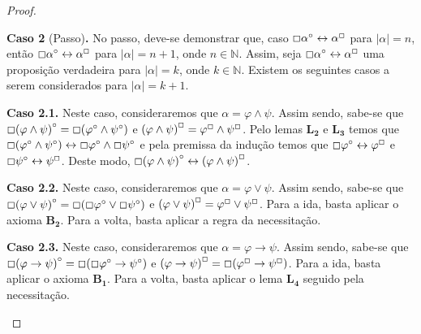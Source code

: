 \begin{theorem}
\begin{proof}
            \begin{case}
                \textbf{Caso 2} (Passo)\textbf{.} No passo, deve-se demonstrar que, caso $\Box\alpha^\circ\leftrightarrow\alpha^\Box$ para $|\alpha| = n$, 
                então $\Box\alpha^\circ\leftrightarrow\alpha^\Box$ para $|\alpha| = n + 1$, onde $n \in \mathbb{N}$. Assim, seja $\Box\alpha^\circ\leftrightarrow\alpha^\Box$ uma proposição verdadeira para $|\alpha| = k$, onde $k \in \mathbb{N}$. Existem os seguintes casos a serem considerados para $|\alpha| = k + 1$.
            \end{case}
    
                \begin{subcase}
                    \textbf{Caso 2.1.}
                    Neste caso, consideraremos que $\alpha = \varphi\wedge\psi$.
                    Assim sendo, sabe-se que $\Box{(\varphi\wedge\psi)}^\circ=\Box(\varphi^\circ\wedge\psi^\circ)$ e ${(\varphi\wedge\psi)}^\Box=\varphi^\Box\wedge\psi^\Box$.
                    Pelo lemas $\mathbf{L_2}$ e $\mathbf{L_3}$ temos que $\Box(\varphi^\circ\wedge\psi^\circ)\leftrightarrow\Box\varphi^\circ\wedge\Box\psi^\circ$ e pela premissa da indução temos que $\Box\varphi^\circ\leftrightarrow\varphi^\Box$ e $\Box\psi^\circ\leftrightarrow\psi^\Box$.
                    Deste modo, $\Box{(\varphi\wedge\psi)}^\circ\leftrightarrow{(\varphi\wedge\psi)}^\Box$.
                \end{subcase}
    
                \begin{subcase}
                    \textbf{Caso 2.2.}
                    Neste caso, consideraremos que $\alpha = \varphi\vee\psi$.
                    Assim sendo, sabe-se que $\Box{(\varphi\vee\psi)}^\circ=\Box(\Box\varphi^\circ\vee\Box\psi^\circ)$ e ${(\varphi\vee\psi)}^\Box=\varphi^\Box\vee\psi^\Box$.
                    Para a ida, basta aplicar o axioma $\mathbf{B_2}$.
                    Para a volta, basta aplicar a regra da necessitação.
                \end{subcase}
    
                \begin{subcase}
                    \textbf{Caso 2.3.}
                    Neste caso, consideraremos que $\alpha=\varphi\to\psi$.
                    Assim sendo, sabe-se que $\Box{(\varphi\to\psi)}^\circ=\Box(\Box\varphi^\circ\to\psi^\circ)$ e ${(\varphi\to\psi)}^\Box=\Box(\varphi^\Box\to\psi^\Box)$.
                    Para a ida, basta aplicar o axioma $\mathbf{B_1}$.
                    Para a volta, basta aplicar o lema $\mathbf{L_4}$ seguido pela necessitação.
                    \qedhere
                \end{subcase}
        \end{proof}
    \end{theorem}

